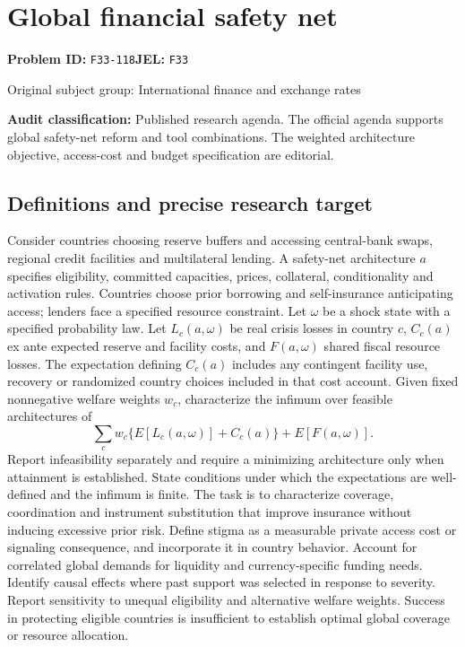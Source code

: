\documentclass[11pt,a4paper]{article}
\begin{document}
\section*{Global financial safety net}
\textbf{Problem ID:} \texttt{F33-118}\quad \textbf{JEL:} \texttt{F33}\par
\label{problem:OP-0339}
{\sffamily\small\color{muted}Original subject group: International finance and exchange rates\par}
\label{definitions:problem:30007621}
\textbf{Audit classification:} Published research agenda. The official agenda supports global safety-net reform and tool combinations. The weighted architecture objective, access-cost and budget specification are editorial.
\subsection*{Definitions and precise research target}
Consider countries choosing reserve buffers and accessing central-bank swaps, regional credit facilities and multilateral lending. A safety-net architecture \(a\) specifies eligibility, committed capacities, prices, collateral, conditionality and activation rules. Countries choose prior borrowing and self-insurance anticipating access; lenders face a specified resource constraint. Let \(\omega\) be a shock state with a specified probability law. Let \(L_c(a,\omega)\) be real crisis losses in country \(c\), \(C_c(a)\) ex ante expected reserve and facility costs, and \(F(a,\omega)\) shared fiscal resource losses. The expectation defining \(C_c(a)\) includes any contingent facility use, recovery or randomized country choices included in that cost account. Given fixed nonnegative welfare weights \(w_c\), characterize the infimum over feasible architectures of
\[\sum_cw_c\{E[L_c(a,\omega)]+C_c(a)\}+E[F(a,\omega)].\]
Report infeasibility separately and require a minimizing architecture only when attainment is established. State conditions under which the expectations are well-defined and the infimum is finite.
The task is to characterize coverage, coordination and instrument substitution that improve insurance without inducing excessive prior risk. Define stigma as a measurable private access cost or signaling consequence, and incorporate it in country behavior. Account for correlated global demands for liquidity and currency-specific funding needs. Identify causal effects where past support was selected in response to severity. Report sensitivity to unequal eligibility and alternative welfare weights. Success in protecting eligible countries is insufficient to establish optimal global coverage or resource allocation.
\end{document}

